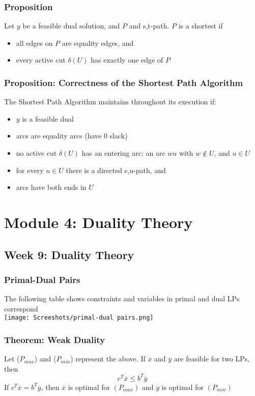 \documentclass[11pt]{article}
\begin{document}
\subsubsection{Proposition}
Let $y$ be a feasible dual solution, and $P$ and s,t-path. $P$ is a shortest if 
\begin{itemize}
  \item all edges on $P$ are equality edges, and 
  \item every active cut $\delta(U)$ has exactly one edge of $P$
\end{itemize}
\subsubsection{Proposition: Correctness of the Shortest Path Algorithm}
The Shortest Path Algorithm maintains throughout its execution if:
\begin{itemize}
  \item $y$ is a feasible dual 
  \item arcs are equality arcs (have $0$ slack)
  \item no active cut $\delta(U)$ has an entering arc: an arc $wu$ with $w\notin U$, and $u\in U$
  \item for every $u\in U$ there is a directed s,u-path, and
  \item arcs have both ends in $U$
\end{itemize}

\section{Module 4: Duality Theory}
\subsection{Week 9: Duality Theory}
\subsubsection{Primal-Dual Pairs}
The following table shows constraints and variables in primal and dual LPs correspond \\
\texttt{[image: Screeshots/primal-dual pairs.png]}
\subsubsection{Theorem: Weak Duality}
Let ($P_{max}$) and ($P_{min}$) represent the above. If $\overline{x}$ and $\overline{y}$ are feasible for two LPs, then \[c^T\overline{x}\leq b^T\overline{y}\]
If $c^T\overline{x} = b^T\overline{y}$, then $\overline{x}$ is optimal for $(P_{max})$ and $\overline{y}$ is optimal for $(P_{min})$
\end{document}
